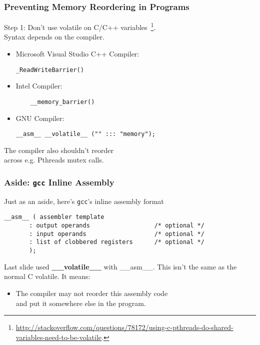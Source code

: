\begin{frame}[fragile]
  \frametitle{Preventing Memory Reordering in Programs}

  
     Step 1: Don't use volatile on C/C++ variables~\footnote{\tiny \url{http://stackoverflow.com/questions/78172/using-c-pthreads-do-shared-variables-need-to-be-volatile}.}.\\[1em]
     Syntax depends on the compiler.\\

\begin{itemize}
  \item Microsoft Visual Studio C++ Compiler:
  \begin{lstlisting}
_ReadWriteBarrier()
  \end{lstlisting}
  \item Intel Compiler:
  \begin{lstlisting}
    __memory_barrier()
  \end{lstlisting}
  \item GNU Compiler:
  \begin{lstlisting}
__asm__ __volatile__ ("" ::: "memory");
  \end{lstlisting}
\end{itemize}

  The compiler also shouldn't reorder\\ across e.g. Pthreads mutex calls.
  
\end{frame}

\begin{frame}[fragile]
  \frametitle{Aside: {\tt gcc} Inline Assembly}

  

  Just as an aside, here's {\tt gcc}'s inline assembly format

  \begin{lstlisting}
__asm__ ( assembler template 
       : output operands                  /* optional */
       : input operands                   /* optional */
       : list of clobbered registers      /* optional */
       );
  \end{lstlisting}
  \vfill
  Last slide used {\bf \_\_volatile\_\_} with  \_\_asm\_\_. This isn't the same as the normal C volatile. It means:

  \begin{itemize}
    \item The compiler may not reorder this assembly code\\ and put it somewhere
      else in the program.
  \end{itemize}
  

\end{frame}

